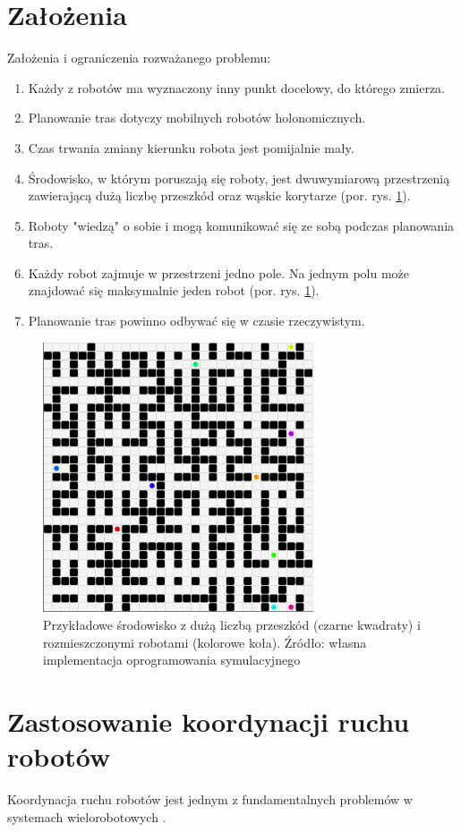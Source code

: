\section{Założenia}
\label{ch:zalozenia}
Założenia i ograniczenia rozważanego problemu:
\begin{enumerate}
	\item Każdy z robotów ma wyznaczony inny punkt docelowy, do którego zmierza.
	\item Planowanie tras dotyczy mobilnych robotów holonomicznych.
	\item Czas trwania zmiany kierunku robota jest pomijalnie mały.
	\item Środowisko, w którym poruszają się roboty, jest dwuwymiarową przestrzenią zawierającą dużą liczbę przeszkód oraz wąskie korytarze (por. rys. \ref{fig:img_robopath_sample-maze}).
	\item Roboty "wiedzą" o sobie i mogą komunikować się ze sobą podczas planowania tras.
	\item Każdy robot zajmuje w przestrzeni jedno pole. Na jednym polu może znajdować się maksymalnie jeden robot (por. rys. \ref{fig:img_robopath_sample-maze}).
	\item Planowanie tras powinno odbywać się w czasie rzeczywistym.
\end{enumerate}

\begin{figure}[H]
	\centering
	\includegraphics[width=8cm]{img/robopath/sample-maze}
	\caption{Przykładowe środowisko z dużą liczbą przeszkód (czarne kwadraty) i rozmieszczonymi robotami (kolorowe koła). Źródło: własna implementacja oprogramowania symulacyjnego}
	\label{fig:img_robopath_sample-maze}
\end{figure}


\section{Zastosowanie koordynacji ruchu robotów}
Koordynacja ruchu robotów jest jednym z fundamentalnych problemów w systemach wielorobotowych \cite{optpriorities}.

